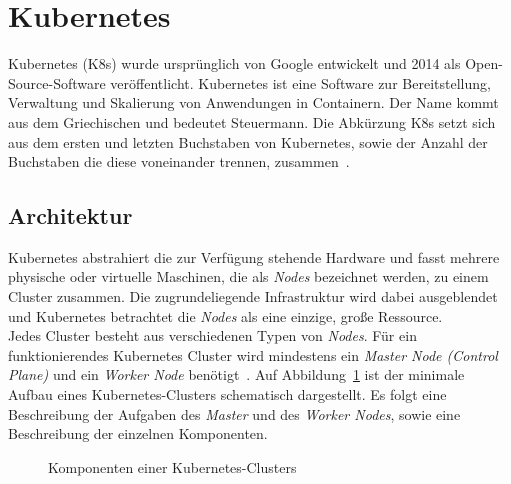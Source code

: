 \section{Kubernetes}\label{sec:kubernetes}

Kubernetes (K8s) wurde ursprünglich von Google entwickelt und 2014 als Open-Source-Software veröffentlicht.
Kubernetes ist eine Software zur Bereitstellung, Verwaltung und Skalierung von Anwendungen in Containern. Der Name kommt aus dem Griechischen und bedeutet Steuermann.
Die Abkürzung K8s setzt sich aus dem ersten und letzten Buchstaben von Kubernetes, sowie der Anzahl der Buchstaben die diese voneinander trennen, zusammen~\cite{kubernetes-google-cloud}.

\subsection{Architektur}

Kubernetes abstrahiert die zur Verfügung stehende Hardware und fasst mehrere physische oder virtuelle Maschinen,
die als \textit{Nodes} bezeichnet werden, zu einem Cluster zusammen.
Die zugrundeliegende Infrastruktur wird dabei ausgeblendet und Kubernetes betrachtet die \textit{Nodes} als eine einzige, große Ressource.
\\
Jedes Cluster besteht aus verschiedenen Typen von \textit{Nodes}.
Für ein funktionierendes Kubernetes Cluster wird mindestens ein \textit{Master Node (Control Plane)} und ein \textit{Worker Node} benötigt~\cite{kubernetes-in-action-introduction}.
Auf Abbildung~\ref{fig:kubernetes-architecture} ist der minimale Aufbau eines Kubernetes-Clusters schematisch dargestellt. Es folgt eine
Beschreibung der Aufgaben des \textit{Master} und des \textit{Worker Nodes}, sowie eine Beschreibung der einzelnen Komponenten.

\begin{figure}[htp] %
      \centering
      \caption{Komponenten einer Kubernetes-Clusters}
      \label{fig:kubernetes-architecture}
\end{figure}

